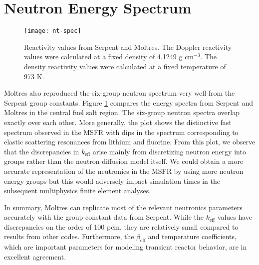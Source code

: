\section{Neutron Energy Spectrum}

\begin{figure}[htb!]
    \centering
    \texttt{[image: nt-spec]}
    \caption{Reactivity values from Serpent and Moltres. The Doppler
    reactivity values were calculated at a fixed density of 4.1249 g
    cm$^{-3}$. The density reactivity values were calculated at a fixed
    temperature of 973 K.}
    \label{fig:ntspec}
\end{figure}

Moltres also reproduced the six-group neutron spectrum very well from the
Serpent group constants. Figure \ref{fig:ntspec} compares the energy spectra
from Serpent and Moltres in the central fuel salt region. The six-group
neutron spectra overlap exactly over each other. More generally, the plot
shows the distinctive fast spectrum observed in the \gls{MSFR} with dips in
the spectrum corresponding to elastic scattering resonances from lithium and
fluorine. From this plot, we observe that the discrepancies in
$k_{\text{eff}}$ arise mainly from discretizing neutron energy into groups
rather than the neutron diffusion model itself. We could obtain a more
accurate representation of the neutronics in the \gls{MSFR} by using more
neutron energy groups but this would adversely impact simulation times in the
subsequent multiphysics finite element analyses.

In summary, Moltres can replicate most of the relevant neutronics parameters
accurately with the group constant data from Serpent. While the
$k_{\text{eff}}$ values have discrepancies on the order of 100 pcm, they are
relatively small compared to results from other codes. Furthermore, the
$\beta_{\text{eff}}$ and temperature coefficients, which are important
parameters for modeling transient reactor behavior, are in excellent
agreement.
